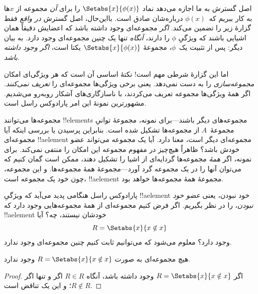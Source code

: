 \documentclass[../../../include/open-logic-section]{subfiles}
\begin{document}

اصل گسترش به ما اجازه می‌دهد نماد $\Setabs{x}{\phi(x)}$ را برای
\emph{آن} مجموعه از $x$ها به کار ببریم که~$\phi(x)$ درباره‌شان صادق
است. بااین‌حال، اصل گسترش \emph{در واقع} فقط گزارهٔ زیر را
تضمین می‌کند. \emph{اگر} مجموعه‌ای وجود داشته باشد که اعضایش دقیقاً
همان اشیایی باشند که ویژگیِ $\phi$ را دارند، \emph{آنگاه} تنها یک چنین
مجموعه‌ای وجود دارد. به بیان دیگر: پس از تثبیت یک~$\phi$، مجموعهٔ
$\Setabs{x}{\phi(x)}$ یکتا است، \emph{اگر وجود داشته باشد}.

اما این گزارهٔ شرطی مهم است!{} نکتهٔ اساسی آن است که هر ویژگی‌ای امکان
\emph{مجموعه‌سازی} را به دست نمی‌دهد. یعنی برخی ویژگی‌ها مجموعه‌ای را
\emph{تعریف نمی‌کنند}. اگر همهٔ ویژگی‌ها مجموعه تعریف می‌کردند، با
ناسازگاری‌های آشکار روبه‌رو می‌شدیم. مشهورترین نمونهٔ این امر پارادوکس
راسل است.

مجموعه‌ها می‌توانند !!{element}s مجموعه‌های دیگر باشند---برای نمونه،
مجموعهٔ توانیِ مجموعهٔ~$A$ از مجموعه‌ها تشکیل شده است. بنابراین
پرسیدن یا بررسی اینکه آیا مجموعه‌ای !!a{element} مجموعه‌ای دیگر است،
معنا دارد. آیا یک مجموعه می‌تواند عضو خودش باشد؟ ظاهراً هیچ‌چیز در
مفهوم مجموعه این امکان را منتفی نمی‌کند. برای نمونه، اگر \emph{همهٔ}
مجموعه‌ها گردایه‌ای از اشیا را تشکیل دهند، ممکن است گمان کنیم که
می‌توان آنها را در یک مجموعه گرد آورد---مجموعهٔ همهٔ مجموعه‌ها. و این
مجموعه، چون خود یک مجموعه است، !!a{element} مجموعهٔ همهٔ مجموعه‌ها
خواهد بود.

پارادوکس راسل هنگامی پدید می‌آید که ویژگیِ !!a{element} خود نبودن، یعنی
\emph{عضو خود نبودن}، را در نظر بگیریم. اگر فرض کنیم مجموعه‌ای از همهٔ
مجموعه‌هایی وجود دارد که !!a{element} خودشان نیستند، چه؟ آیا
\[
R = \Setabs{x}{x \notin x}
\]
وجود دارد؟ معلوم می‌شود که می‌توانیم ثابت کنیم چنین مجموعه‌ای وجود ندارد.

\begin{thm}
	هیچ مجموعه‌ای به صورت $R = \Setabs{x}{x \notin x}$ وجود ندارد.
\end{thm}

\begin{proof}
اگر $R = \Setabs{x}{x \notin x}$ وجود داشته باشد، آنگاه
$R \in R$ اگر و تنها اگر $R \notin R$؛ و این یک تناقض است.
\end{proof}
\end{document}
